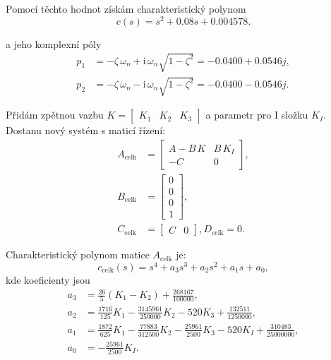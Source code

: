 \documentclass[12pt]{article}
\begin{document}
Pomocí těchto hodnot získám charakteristický polynom
\begin{equation}
c(s) = s^2 + 0.08s + 0.004578.
\end{equation}

a jeho komplexní póly
\begin{equation}\label{eq:params}
\begin{aligned}
p_{1} &= -\zeta\,\omega_n + \mathrm{i}\,\omega_n\sqrt{1-\zeta^2} = -0.0400 + 0.0546j, \\[6pt]
p_{2} &= -\zeta\,\omega_n - \mathrm{i}\,\omega_n\sqrt{1-\zeta^2} = -0.0400 - 0.0546j.
\end{aligned}
\end{equation}

Přidám zpětnou vazbu $K = \begin{bmatrix} K_1 & K_2 & K_3 \end{bmatrix}$ a parametr pro I složku $K_I$. Dostanu nový 
systém s maticí řízení:
\begin{equation}
\begin{aligned}
A_{\mathrm{celk}} &= \begin{bmatrix} A - B\,K & B\,K_I \\
                                -C & 0 \end{bmatrix}, \\
B_{\mathrm{celk}} &= \begin{bmatrix} 0 \\
                                        0 \\
                                        0 \\
                                        1 \end{bmatrix}, \\
C_{\mathrm{celk}} &= \begin{bmatrix} C & 0 \end{bmatrix},
D_{\mathrm{celk}} = 0.
\end{aligned}
\end{equation}

Charakteristický polynom matice $A_{\mathrm{celk}}$ je:
\begin{equation}
c_{\mathrm{celk}}(s)=s^{4}+a_{3}s^{3}+a_{2}s^{2}+a_{1}s+a_{0},
\end{equation}
kde koeficienty jsou
\begin{equation}
\begin{aligned}
a_{3} &= \frac{26}{5}(K_{1}-K_{2}) + \frac{268167}{100000}, \\
a_{2} &= \frac{1716}{125}K_{1} - \frac{3145961}{250000}K_{2} - 520K_{3} + \frac{132511}{1250000}, \\
a_{1} &= \frac{1872}{625}K_{1} - \frac{77883}{312500}K_{2} - \frac{25961}{2500}K_{3} - 520K_{I} + \frac{310483}{25000000}, \\
a_{0} &= -\frac{25961}{2500}K_{I}.
\end{aligned}
\end{equation}
\end{document}
